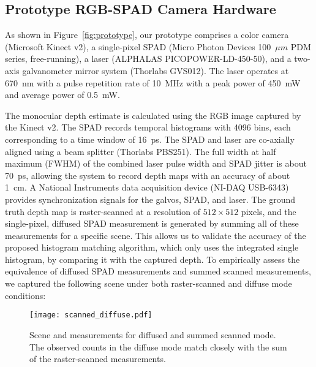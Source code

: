 
\subsection{Prototype RGB-SPAD Camera Hardware}


As shown in Figure~\ref{fig:prototype}, our prototype comprises a color camera
(Microsoft Kinect v2), a single-pixel SPAD (Micro Photon Devices 100~$\mu m$ PDM
series, free-running), a laser (ALPHALAS PICOPOWER-LD-450-50), and a two-axis
galvanometer mirror system (Thorlabs GVS012). The laser operates at 670~nm with
a pulse repetition rate of 10~MHz with a peak power of 450~mW and average power
of 0.5~mW.

The monocular depth estimate is calculated
using the RGB image captured by the Kinect v2.
The SPAD records temporal histograms with 4096 bins, each corresponding to a
time window of 16~ps. The SPAD and laser are co-axially aligned using a beam
splitter (Thorlabs PBS251). The full width at half maximum (FWHM) of the
combined laser pulse width and SPAD jitter is about 70~ps, allowing the system
to record depth maps with an accuracy of about 1~cm. A National Instruments data
acquisition device (NI-DAQ USB-6343) provides synchronization signals for the
galvos, SPAD, and laser. The ground truth depth map is raster-scanned at a
resolution of $512 \times 512$ pixels, and the single-pixel, diffused SPAD
measurement is generated by summing all of these measurements for a specific
scene. This allows us to validate the accuracy of the proposed histogram
matching algorithm, which only uses the integrated single histogram, by
comparing it with the captured depth. To empirically assess the equivalence of
diffused SPAD measurements and summed scanned measurements, we captured the
following scene under both raster-scanned and diffuse mode conditions:

\begin{figure}[t]
	\centering
  \texttt{[image: scanned\_diffuse.pdf]}
  \caption{Scene and measurements for diffused and summed scanned mode. The observed
    counts in the diffuse mode match closely with the sum of the raster-scanned
    measurements.}
  \label{fig:scanned_diffuse}
\end{figure}

